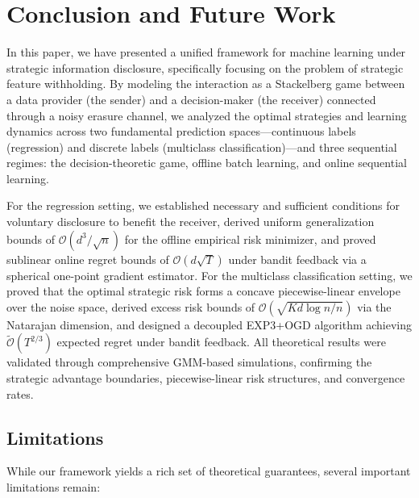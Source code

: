 \section{Conclusion and Future Work}
\label{sec:conclusion}

In this paper, we have presented a unified framework for machine learning under strategic information disclosure, specifically focusing on the problem of strategic feature withholding. By modeling the interaction as a Stackelberg game between a data provider (the sender) and a decision-maker (the receiver) connected through a noisy erasure channel, we analyzed the optimal strategies and learning dynamics across two fundamental prediction spaces—continuous labels (regression) and discrete labels (multiclass classification)—and three sequential regimes: the decision-theoretic game, offline batch learning, and online sequential learning.

For the regression setting, we established necessary and sufficient conditions for voluntary disclosure to benefit the receiver, derived uniform generalization bounds of $\mathcal{O}(d^3/\sqrt{n})$ for the offline empirical risk minimizer, and proved sublinear online regret bounds of $\mathcal{O}(d\sqrt{T})$ under bandit feedback via a spherical one-point gradient estimator. For the multiclass classification setting, we proved that the optimal strategic risk forms a concave piecewise-linear envelope over the noise space, derived excess risk bounds of $\mathcal{O}(\sqrt{Kd\log n / n})$ via the Natarajan dimension, and designed a decoupled EXP3+OGD algorithm achieving $\tilde{\mathcal{O}}(T^{2/3})$ expected regret under bandit feedback. All theoretical results were validated through comprehensive GMM-based simulations, confirming the strategic advantage boundaries, piecewise-linear risk structures, and convergence rates.

\subsection{Limitations}
\label{sec:limitations}

While our framework yields a rich set of theoretical guarantees, several important limitations remain:

